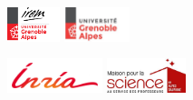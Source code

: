 \documentclass[a4paper]{article}
\begin{document}
\begin{minipage}{6cm}
\vspace{3mm}
\includegraphics[height=10mm]{logo_IREM_UGA_transitoire}
\hfill
\includegraphics[height=10mm]{logo-universite-grenoble-alpes}

\includegraphics[height=10mm]{inria}%
\hfill
\includegraphics[height=10mm]{logo_MPLSblanc}
\end{minipage}

\vfill

\end{document}
